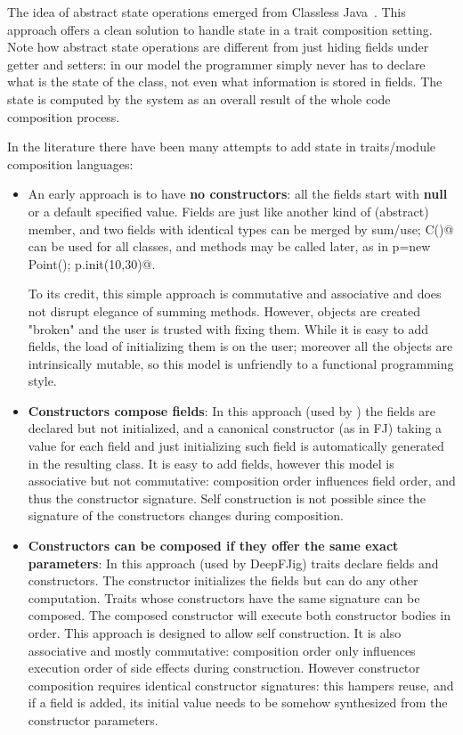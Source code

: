 The idea of abstract state operations emerged from Classless
Java~\cite{wang2016classless}. This approach offers a clean solution to handle state
in a trait composition setting.
Note how abstract state operations are different from just hiding fields under getter and setters: 
in our model the programmer simply never has to declare what is the state of the class, not even what information is stored in fields.
The state is computed by the system as an overall result of the whole code composition process.

In the literature there have been many attempts to add state in traits/module composition languages:
\begin{itemize}  
\item An early approach is to have {\bf no constructors}: all the fields start with {\bf null} or a default specified value.
  Fields are just like another kind of (abstract) member, and two fields
  with identical types can be merged by sum/use; \Q@new C()@ can be used for all classes, and \Q@init@ methods may be called later, as in
  \Q@Point p=new Point(); p.init(10,30)@.
  
  To its credit, this simple approach is commutative and associative and does not disrupt elegance of summing methods.
  However, objects are created "broken" and the user is trusted with fixing them.
  While it is easy to add fields, the load of initializing them is on the user; moreover
    all the objects are intrinsically mutable, so this model is unfriendly
    to a functional programming style.
\item {\bf Constructors compose fields}:
In this approach (used by \cite{fjig}) the fields are declared but not initialized, and
a canonical constructor (as in FJ) taking a value for each field and just initializing such field
is automatically generated in the resulting class.
It is easy to add fields, however this model is associative but not commutative: composition order influences field order, and thus the constructor signature.
Self construction is not possible 
since the signature of the constructors changes during composition.

\item {\bf Constructors can be composed if they offer the same exact parameters}:
In this approach (used by DeepFJig) traits declare fields and constructors.
The constructor initializes the fields but can do any other computation.
Traits whose constructors have the same signature can be composed.
The composed constructor will execute both constructor bodies in order.
This approach is designed to allow self construction.
It is also associative and mostly commutative: composition order only influences execution order of side effects during construction.
However constructor composition requires identical constructor signatures: this
hampers reuse, and if a field is added, its initial value needs to be
somehow synthesized from the constructor parameters.

\end{itemize}

